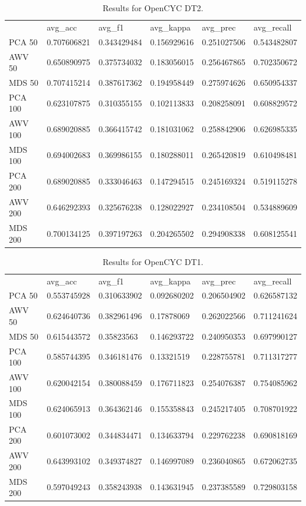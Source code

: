 \begin{table}[]
	\begin{tabular}{llllll}
		& avg\_acc    & avg\_f1     & avg\_kappa  & avg\_prec   & avg\_recall \\
		PCA 50  & 0.707606821 & 0.343429484 & 0.156929616 & 0.251027506 & 0.543482807 \\
		AWV 50  & 0.650890975 & 0.375734032 & 0.183056015 & 0.256467865 & 0.702350672 \\
		MDS 50  & 0.707415214 & 0.387617362 & 0.194958449 & 0.275974626 & 0.650954337 \\
		PCA 100 & 0.623107875 & 0.310355155 & 0.102113833 & 0.208258091 & 0.608829572 \\
		AWV 100 & 0.689020885 & 0.366415742 & 0.181031062 & 0.258842906 & 0.626985335 \\
		MDS 100 & 0.694002683 & 0.369986155 & 0.180288011 & 0.265420819 & 0.610498481 \\
		PCA 200 & 0.689020885 & 0.333046463 & 0.147294515 & 0.245169324 & 0.519115278 \\
		AWV 200 & 0.646292393 & 0.325676238 & 0.128022927 & 0.234108504 & 0.534889609 \\
		MDS 200 & 0.700134125 & 0.397197263 & 0.204265502 & 0.294908338 & 0.608125541
	\end{tabular}
	\caption{Results for OpenCYC DT2.}
	\label{table:Newsgroups}
\end{table}

\begin{table}[]
	\begin{tabular}{llllll}
		& avg\_acc    & avg\_f1     & avg\_kappa  & avg\_prec   & avg\_recall \\
		PCA 50  & 0.553745928 & 0.310633902 & 0.092680202 & 0.206504902 & 0.626587132 \\
		AWV 50  & 0.624640736 & 0.382961496 & 0.17878069  & 0.262022566 & 0.711241624 \\
		MDS 50  & 0.615443572 & 0.35823563  & 0.146293722 & 0.240950353 & 0.697990127 \\
		PCA 100 & 0.585744395 & 0.346181476 & 0.13321519  & 0.228755781 & 0.711317277 \\
		AWV 100 & 0.620042154 & 0.380088459 & 0.176711823 & 0.254076387 & 0.754085962 \\
		MDS 100 & 0.624065913 & 0.364362146 & 0.155358843 & 0.245217405 & 0.708701922 \\
		PCA 200 & 0.601073002 & 0.344834471 & 0.134633794 & 0.229762238 & 0.690818169 \\
		AWV 200 & 0.643993102 & 0.349374827 & 0.146997089 & 0.236040865 & 0.672062735 \\
		MDS 200 & 0.597049243 & 0.358243938 & 0.143631945 & 0.237385589 & 0.729803158
	\end{tabular}
	\caption{Results for OpenCYC DT1.}
	\label{table:Newsgroups}
\end{table}


